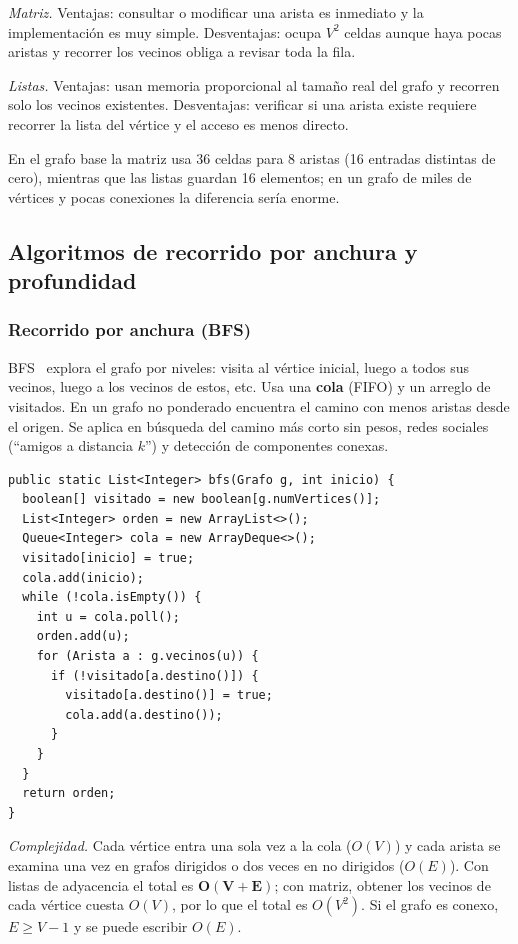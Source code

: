 \documentclass[conference]{IEEEtran}
\begin{document}
\emph{Matriz.} Ventajas: consultar o modificar una arista es inmediato y la implementación es muy simple. Desventajas: ocupa $V^2$ celdas aunque haya pocas aristas y recorrer los vecinos obliga a revisar toda la fila.

\emph{Listas.} Ventajas: usan memoria proporcional al tamaño real del grafo y recorren solo los vecinos existentes. Desventajas: verificar si una arista existe requiere recorrer la lista del vértice y el acceso es menos directo.

En el grafo base la matriz usa 36 celdas para 8 aristas (16 entradas distintas de cero), mientras que las listas guardan 16 elementos; en un grafo de miles de vértices y pocas conexiones la diferencia sería enorme.

\subsection{Algoritmos de recorrido por anchura y profundidad}

\subsubsection{Recorrido por anchura (BFS)}
BFS~\cite{moore,cormen} explora el grafo por niveles: visita al vértice inicial, luego a todos sus vecinos, luego a los vecinos de estos, etc. Usa una \textbf{cola} (FIFO) y un arreglo de visitados. En un grafo no ponderado encuentra el camino con menos aristas desde el origen. Se aplica en búsqueda del camino más corto sin pesos, redes sociales (``amigos a distancia $k$'') y detección de componentes conexas.

\begin{lstlisting}[caption={BFS (Recorridos.java)}]
public static List<Integer> bfs(Grafo g, int inicio) {
  boolean[] visitado = new boolean[g.numVertices()];
  List<Integer> orden = new ArrayList<>();
  Queue<Integer> cola = new ArrayDeque<>();
  visitado[inicio] = true;
  cola.add(inicio);
  while (!cola.isEmpty()) {
    int u = cola.poll();
    orden.add(u);
    for (Arista a : g.vecinos(u)) {
      if (!visitado[a.destino()]) {
        visitado[a.destino()] = true;
        cola.add(a.destino());
      }
    }
  }
  return orden;
}
\end{lstlisting}

\emph{Complejidad.} Cada vértice entra una sola vez a la cola ($O(V)$) y cada arista se examina una vez en grafos dirigidos o dos veces en no dirigidos ($O(E)$). Con listas de adyacencia el total es $\mathbf{O(V+E)}$; con matriz, obtener los vecinos de cada vértice cuesta $O(V)$, por lo que el total es $O(V^2)$. Si el grafo es conexo, $E\ge V-1$ y se puede escribir $O(E)$.
\end{document}
